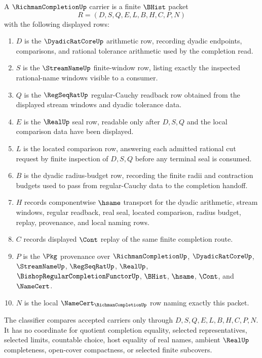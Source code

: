 \begin{definition}
\label{def:richman-completion-carrier}
A $\RichmanCompletionUp$ carrier is a finite $\BHist$ packet
$$
R=(D,S,Q,E,L,B,H,C,P,N)
$$
with the following displayed rows:
\begin{enumerate}
\item $D$ is the $\DyadicRatCoreUp$ arithmetic row, recording dyadic endpoints, comparisons, and rational tolerance arithmetic used by the completion read.
\item $S$ is the $\StreamNameUp$ finite-window row, listing exactly the inspected rational-name windows visible to a consumer.
\item $Q$ is the $\RegSeqRatUp$ regular-Cauchy readback row obtained from the displayed stream windows and dyadic tolerance data.
\item $E$ is the $\RealUp$ seal row, readable only after $D,S,Q$ and the local comparison data have been displayed.
\item $L$ is the located comparison row, answering each admitted rational cut request by finite inspection of $D,S,Q$ before any terminal seal is consumed.
\item $B$ is the dyadic radius-budget row, recording the finite radii and contraction budgets used to pass from regular-Cauchy data to the completion handoff.
\item $H$ records componentwise $\hsame$ transport for the dyadic arithmetic, stream windows, regular readback, real seal, located comparison, radius budget, replay, provenance, and local naming rows.
\item $C$ records displayed $\Cont$ replay of the same finite completion route.
\item $P$ is the $\Pkg$ provenance over $\RichmanCompletionUp$, $\DyadicRatCoreUp$, $\StreamNameUp$, $\RegSeqRatUp$, $\RealUp$, $\BishopRegularCompletionFunctorUp$, $\BHist$, $\hsame$, $\Cont$, and $\NameCert$.
\item $N$ is the local $\NameCert_{\RichmanCompletionUp}$ row naming exactly this packet.
\end{enumerate}
The classifier compares accepted carriers only through $D,S,Q,E,L,B,H,C,P,N$. It has no coordinate for quotient completion equality, selected representatives, selected limits, countable choice, host equality of real names, ambient $\RealUp$ completeness, open-cover compactness, or selected finite subcovers.
\end{definition}

